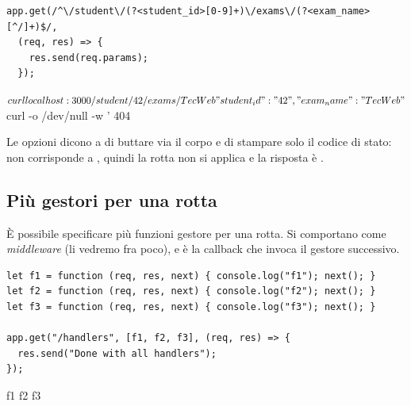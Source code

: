 \begin{lstlisting}[style=js, name=params5.js]
app.get(/^\/student\/(?<student_id>[0-9]+)\/exams\/(?<exam_name>[^/]+)$/,
  (req, res) => {
    res.send(req.params);
  });
\end{lstlisting}

\begin{console}[Terminale]
$ curl localhost:3000/student/42/exams/TecWeb
{"student_id":"42","exam_name":"TecWeb"}
$ curl -o /dev/null -w '%
404
\end{console}

Le opzioni  dicono a  di
buttare via il corpo e di stampare solo il codice di stato:  non
corrisponde a \code{[0-9]+}, quindi la rotta non si applica e la risposta è
.


\subsection{Più gestori per una rotta}

È possibile specificare più funzioni gestore per una rotta. Si comportano come
\textit{middleware} (li vedremo fra poco), e  è la callback che
invoca il gestore successivo.

\begin{affianco}[0.6][t]
\codicepiccolo
\begin{lstlisting}[style=js, name=handlers.js]
let f1 = function (req, res, next) { console.log("f1"); next(); }
let f2 = function (req, res, next) { console.log("f2"); next(); }
let f3 = function (req, res, next) { console.log("f3"); next(); }

app.get("/handlers", [f1, f2, f3], (req, res) => {
  res.send("Done with all handlers");
});
\end{lstlisting}
\begin{immagine}
\end{immagine}
\risultato
{}
\begin{console}
f1
f2
f3
\end{console}
\end{affianco}

